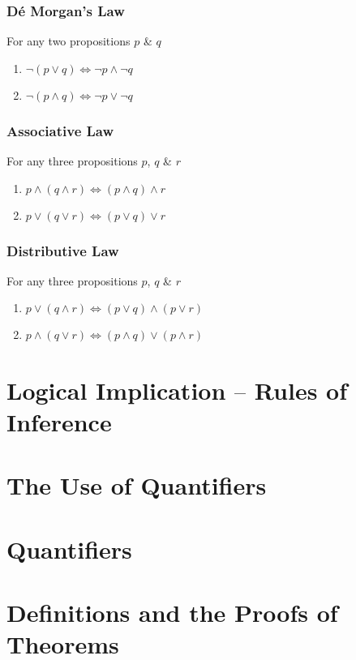 \documentclass{article}
\begin{document}
	\subsubsection{D\'{e} Morgan's Law}
	For any two propositions $p$ \& $q$
	\begin{enumerate}[label=\roman*) ]
		\item $\neg(p\lor q)\Leftrightarrow\neg p\land\neg q$
		\item $\neg(p\land q)\Leftrightarrow\neg p\lor\neg q$
	\end{enumerate}

	\subsubsection{Associative Law}
	For any three propositions $p$, $q$ \& $r$
	\begin{enumerate}[label=\roman*) ]
		\item $p\land(q\land r)\Leftrightarrow (p\land q)\land r$
		\item $p\lor(q\lor r)\Leftrightarrow (p\lor q)\lor r$
	\end{enumerate}

	\subsubsection{Distributive Law}
	For any three propositions $p$, $q$ \& $r$
	\begin{enumerate}[label=\roman*) ]
		\item $p\lor(q\land r)\Leftrightarrow (p\lor q)\land(p\lor r)$
		\item $p\land(q\lor r)\Leftrightarrow (p\land q)\lor(p\land r)$
	\end{enumerate}

	\section{Logical Implication $–$ Rules of Inference}

	\section{The Use of Quantifiers}
	\section{Quantifiers}
	\section{Definitions and the Proofs of Theorems}
\end{document}

